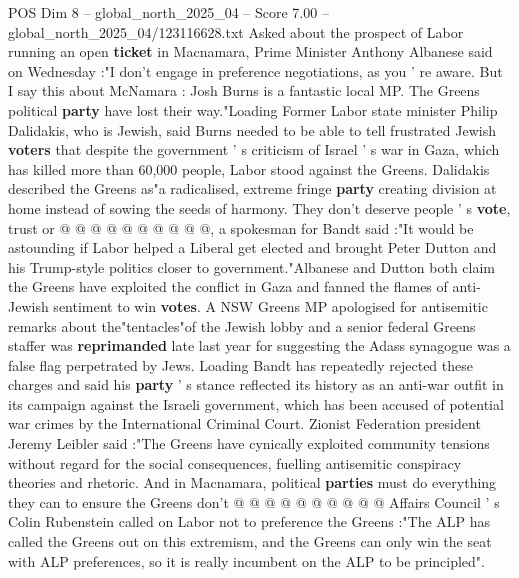 \begin{textsample}{POS Dim 8 – global\_north\_2025\_04 – Score 7.00 – global\_north\_2025\_04/123116628.txt}
Asked about the prospect of Labor running an open \textbf{ticket} in Macnamara, Prime Minister Anthony Albanese said on Wednesday :"I don't engage in preference negotiations, as you ' re aware.
But I say this about McNamara : Josh Burns is a fantastic local MP.
The Greens political \textbf{party} have lost their way."Loading Former Labor state minister Philip Dalidakis, who is Jewish, said Burns needed to be able to tell frustrated Jewish \textbf{voters} that despite the government ' s criticism of Israel ' s war in Gaza, which has killed more than 60,000 people, Labor stood against the Greens.
Dalidakis described the Greens as"a radicalised, extreme fringe \textbf{party} creating division at home instead of sowing the seeds of harmony.
They don't deserve people ' s \textbf{vote}, trust or @ @ @ @ @ @ @ @ @ @, a spokesman for Bandt said :"It would be astounding if Labor helped a Liberal get elected and brought Peter Dutton and his Trump-style politics closer to government."Albanese and Dutton both claim the Greens have exploited the conflict in Gaza and fanned the flames of anti-Jewish sentiment to win \textbf{votes}.
A NSW Greens MP apologised for antisemitic remarks about the"tentacles"of the Jewish lobby and a senior federal Greens staffer was \textbf{reprimanded} late last year for suggesting the Adass synagogue was a false flag perpetrated by Jews.
Loading Bandt has repeatedly rejected these charges and said his \textbf{party} ' s stance reflected its history as an anti-war outfit in its campaign against the Israeli government, which has been accused of potential war crimes by the International Criminal Court.
Zionist Federation president Jeremy Leibler said :"The Greens have cynically exploited community tensions without regard for the social consequences, fuelling antisemitic conspiracy theories and rhetoric.
And in Macnamara, political \textbf{parties} must do everything they can to ensure the Greens don't @ @ @ @ @ @ @ @ @ @ Affairs Council ' s Colin Rubenstein called on Labor not to preference the Greens :"The ALP has called the Greens out on this extremism, and the Greens can only win the seat with ALP preferences, so it is really incumbent on the ALP to be principled".

\end{textsample}
